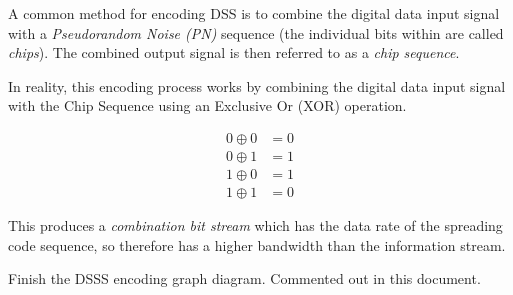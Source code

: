 A common method for encoding DSS is to combine the digital data input signal with a \textit{Pseudorandom Noise (PN)} sequence (the individual bits within are called \textit{chips}). The combined output signal is then referred to as a \textit{chip sequence}.

In reality, this encoding process works by combining the digital data input signal with the Chip Sequence using an Exclusive Or (XOR) operation. 

\begin{align*}
    0 \oplus 0 &= 0\\
    0 \oplus 1 &= 1\\
    1 \oplus 0 &= 1\\
    1 \oplus 1 &= 0
\end{align*}

This produces a \textit{combination bit stream} which has the data rate of the spreading code sequence, so therefore has a higher bandwidth than the information stream. 

\begin{todo}
Finish the DSSS encoding graph diagram. Commented out in this document.
\end{todo}




    
    


